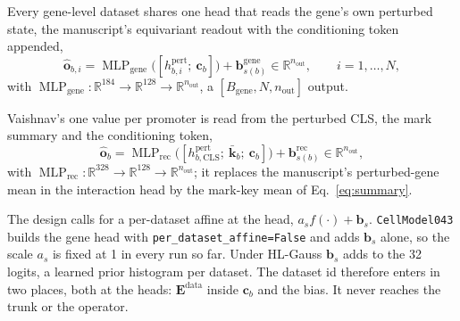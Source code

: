Every gene-level dataset shares one head that reads the gene's own perturbed state, the
manuscript's equivariant readout with the conditioning token appended,
\begin{equation}
\hat{\mathbf{o}}_{b,i} = \operatorname{MLP}_{\mathrm{gene}}\big([h^{\mathrm{pert}}_{b,i} ;\ \mathbf{c}_b]\big) + \mathbf{b}^{\mathrm{gene}}_{s(b)} \in \mathbb{R}^{n_{\mathrm{out}}},
\qquad i = 1, \ldots, N,
\label{eq:genehead}
\end{equation}
with $\operatorname{MLP}_{\mathrm{gene}}: \mathbb{R}^{184} \to \mathbb{R}^{128} \to
\mathbb{R}^{n_{\mathrm{out}}}$, a $[B_{\mathrm{gene}}, N, n_{\mathrm{out}}]$ output.

Vaishnav's one value per promoter is read from the perturbed CLS, the mark summary and the
conditioning token,
\begin{equation}
\hat{\mathbf{o}}_{b} = \operatorname{MLP}_{\mathrm{rec}}\big([h^{\mathrm{pert}}_{b,\mathrm{CLS}} ;\ \bar{\mathbf{k}}_b ;\ \mathbf{c}_b]\big) + \mathbf{b}^{\mathrm{rec}}_{s(b)} \in \mathbb{R}^{n_{\mathrm{out}}},
\label{eq:rechead}
\end{equation}
with $\operatorname{MLP}_{\mathrm{rec}}: \mathbb{R}^{328} \to \mathbb{R}^{128} \to
\mathbb{R}^{n_{\mathrm{out}}}$; it replaces the manuscript's perturbed-gene mean in the
interaction head by the mark-key mean of Eq.~\ref{eq:summary}.

The design calls for a per-dataset affine at the head, $a_s f(\cdot) + \mathbf{b}_s$.
\texttt{CellModel043} builds the gene head with \texttt{per\_dataset\_affine=False} and adds
$\mathbf{b}_s$ alone, so the scale $a_s$ is fixed at 1 in every run so far. Under HL-Gauss
$\mathbf{b}_s$ adds to the 32 logits, a learned prior histogram per dataset. The dataset
id therefore enters in two places, both at the heads: $\mathbf{E}^{\mathrm{data}}$ inside
$\mathbf{c}_b$ and the bias. It never reaches the trunk or the operator.

